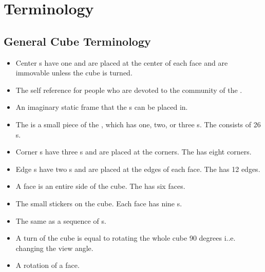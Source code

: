 \chapter{Terminology}
\section{General Cube Terminology}
\label{sec:generalNotation}
\begin{itemize}
\item {}Center \cpiece{}s have one \facet{} and are placed at the center of each face and are immovable unless the cube is turned. 
\item {}The self reference for people who are devoted to the community of the \rubik{}. 
\item {}An imaginary static frame that the \cpiece{}s can be placed in.
\item {}The \cpiece{} is a small piece of the \cube{}, which has one, two, or three \facelet{}s. The \rubik{} consists of 26 \cpiece{}s.
\item {}Corner \cpiece{}s have three \facet{}s and are placed at the corners. The \rubik{} has eight corners. 
\item {}Edge \cpiece{}s have two \facet{}s and are placed at the edges of each face. The \rubik{} has 12 edges.
\item {}A face is an entire side of the cube. The \rubik{} has six faces.
\item {}The small stickers on the cube. Each face has nine \facet{}s.

\item {}The same as a sequence of \twist{}s.

\item {}A turn of the cube is equal to rotating the whole cube 90 degrees i..e. changing the view angle.
\item {}A rotation of a face.%

\end{itemize}

